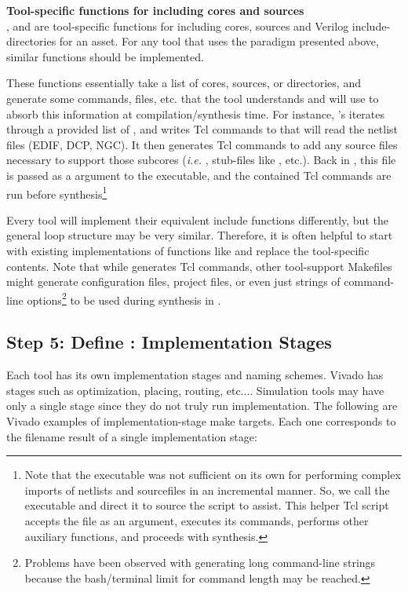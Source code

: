 \setlength{\parindent}{0cm}
\textbf{Tool-specific functions for including cores and sources}\\
,  and  are tool-specific functions for including cores, sources and Verilog include-directories for an asset. For any tool that uses the  paradigm presented above, similar functions should be implemented.\newline

These functions essentially take a list of cores, sources, or directories, and generate some commands, files, etc. that the tool understands and will use to absorb this information at compilation/synthesis time. For instance, 's  iterates through a provided list of , and writes Tcl commands to  that will read the netlist files (EDIF, DCP, NGC). It then generates Tcl commands to add any source files necessary to support those subcores (\textit{i.e.} , stub-files like , etc.). Back in , this  file is passed as a  argument to the  executable, and the contained Tcl commands are run before synthesis\footnote{Note that the  executable was not sufficient on its own for performing complex imports of netlists and sourcefiles in an incremental manner. So, we call the  executable and direct it to source the  script to assist. This helper Tcl script accepts the  file as an argument, executes its commands, performs other auxiliary functions, and proceeds with synthesis.}\newline

Every tool will implement their equivalent include functions differently, but the general loop structure may be very similar. Therefore, it is often helpful to start with existing implementations of functions like  and replace the tool-specific contents. Note that while  generates Tcl commands, other tool-support Makefiles might generate configuration files, project files, or even just strings of command-line options\footnote{Problems have been observed with generating long command-line strings because the bash/terminal limit for command length may be reached.} to be used during synthesis in .

\pagebreak
\subsection{Step 5: Define : Implementation Stages}
\label{impl}
Each tool has its own implementation stages and naming schemes. Vivado has stages such as optimization, placing, routing, etc.... Simulation tools may have only a single stage since they do not truly run implementation. The following are Vivado examples of implementation-stage make targets. Each one corresponds to the filename result of a single implementation stage:\newline

